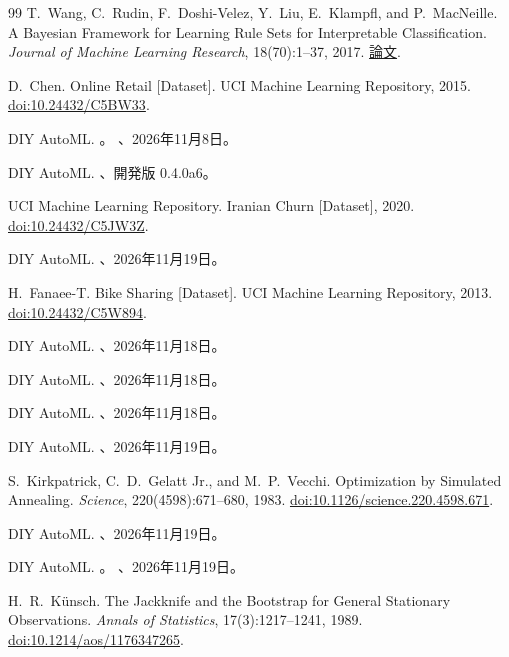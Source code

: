 \begin{thebibliography}{99}
T.~Wang, C.~Rudin, F.~Doshi-Velez, Y.~Liu, E.~Klampfl, and P.~MacNeille.
A Bayesian Framework for Learning Rule Sets for Interpretable Classification.
\textit{Journal of Machine Learning Research}, 18(70):1--37, 2017.
\href{https://jmlr.org/papers/v18/16-003.html}{論文}.

D.~Chen.
Online Retail [Dataset].
UCI Machine Learning Repository, 2015.
\href{https://doi.org/10.24432/C5BW33}{doi:10.24432/C5BW33}.

DIY AutoML.
。
、2026年11月8日。

DIY AutoML.
、開発版 0.4.0a6。

UCI Machine Learning Repository.
Iranian Churn [Dataset], 2020.
\href{https://doi.org/10.24432/C5JW3Z}{doi:10.24432/C5JW3Z}.

DIY AutoML.
、2026年11月19日。

H.~Fanaee-T.
Bike Sharing [Dataset].
UCI Machine Learning Repository, 2013.
\href{https://doi.org/10.24432/C5W894}{doi:10.24432/C5W894}.

DIY AutoML.
、2026年11月18日。

DIY AutoML.
、2026年11月18日。

DIY AutoML.
、2026年11月18日。

DIY AutoML.
、2026年11月19日。

S.~Kirkpatrick, C.~D.~Gelatt Jr., and M.~P.~Vecchi.
Optimization by Simulated Annealing.
\textit{Science}, 220(4598):671--680, 1983.
\href{https://doi.org/10.1126/science.220.4598.671}{doi:10.1126/science.220.4598.671}.

DIY AutoML.
、2026年11月19日。

DIY AutoML.
。
、2026年11月19日。

H.~R.~Künsch.
The Jackknife and the Bootstrap for General Stationary Observations.
\textit{Annals of Statistics}, 17(3):1217--1241, 1989.
\href{https://doi.org/10.1214/aos/1176347265}{doi:10.1214/aos/1176347265}.

\end{thebibliography}
